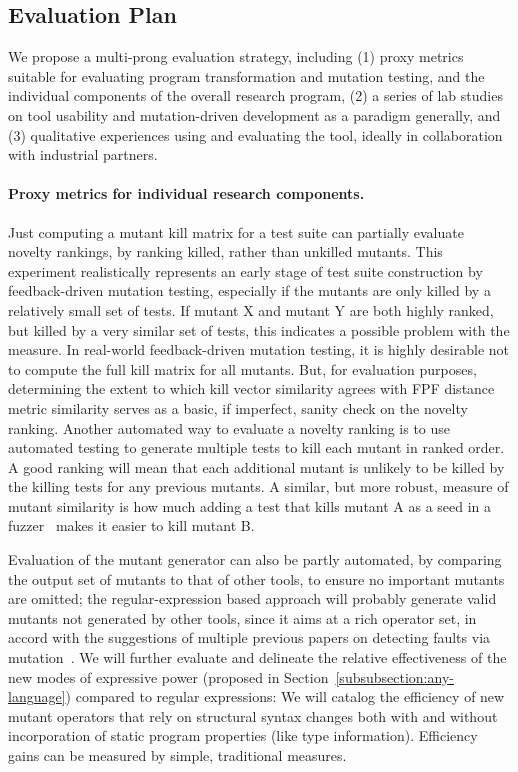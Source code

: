 
\subsection{Evaluation Plan}
\label{sec:evalplan}

We propose a multi-prong evaluation strategy, including (1) proxy metrics
suitable for evaluating program transformation and mutation testing, and the
individual components of the overall research program, (2) a series of lab
studies on tool usability and mutation-driven development as a paradigm
generally, and (3) qualitative experiences using and evaluating the tool,
ideally in collaboration with industrial partners.

\paragraph{Proxy metrics for individual research components.}
Just computing a mutant kill matrix for a test suite can
partially evaluate novelty rankings, by ranking
killed, rather than unkilled mutants. This experiment
realistically represents an early stage of test suite construction by
feedback-driven mutation testing, especially if the mutants are only
killed by a relatively small set of tests.  If
mutant X and mutant Y are both highly ranked, but killed by a very
similar set of tests, this indicates a possible problem with the
measure.  In real-world feedback-driven mutation testing, it is highly
desirable not to compute the full kill matrix for all mutants. But,
for evaluation purposes, determining the extent to which kill
vector similarity agrees with FPF distance metric similarity serves
as a basic, if imperfect, sanity check on the novelty ranking.
Another automated way to evaluate a novelty ranking is to use automated
testing to generate multiple tests to kill each mutant in ranked order.  A good ranking will mean
that each additional mutant is unlikely to be killed by the killing
tests for any previous mutants.  A similar, but more robust, measure of mutant similarity
is how much adding a test that kills mutant A as a seed in a
fuzzer~\cite{aflfuzz,libfuzzer} makes it easier to kill mutant B.

Evaluation of the mutant generator can also be partly automated, by
comparing the output set of mutants to that of other tools, to ensure
no important mutants are omitted; the regular-expression based
approach will probably generate valid mutants not generated by other
tools, since it aims at a rich operator set, in accord with the
suggestions of multiple previous papers on detecting faults via
mutation~\cite{just2014mutants,gopinath2017mutation}.
We will further evaluate and delineate the relative effectiveness of the new modes of expressive power (proposed in Section~\ref{subsubsection:any-language}) compared to regular expressions: We will catalog the efficiency of new mutant operators that rely on structural syntax changes both with and without incorporation of static program properties (like type information).
Efficiency
gains can
be measured by simple, traditional measures.

